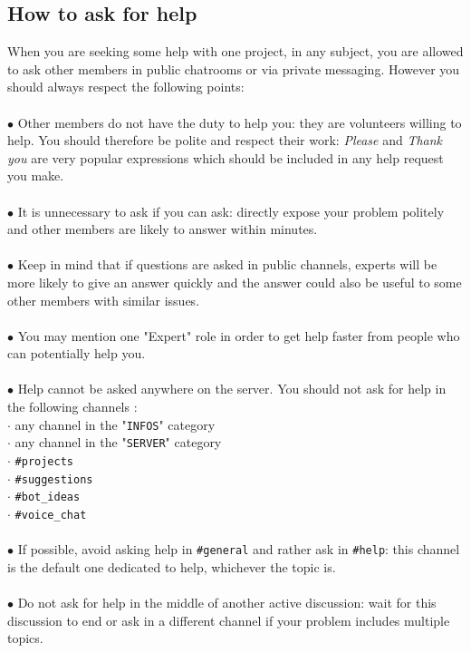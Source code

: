\documentclass[a4paper]{article}
\begin{document}
\subsection{How to ask for help}
When you are seeking some help with one project, in any subject, you are allowed to ask other members in public chatrooms or via private messaging. However you should always respect the following points:\\\\
$\bullet$ Other members do not have the duty to help you: they are volunteers willing to help. You should therefore be polite and respect their work: \textsl{Please} and \textsl{Thank you} are very popular expressions which should be included in any help request you make.\\\\
$\bullet$ It is unnecessary to ask if you can ask: directly expose your problem politely and other members are likely to answer within minutes.\\\\
$\bullet$ Keep in mind that if questions are asked in public channels, experts will be more likely to give an answer quickly and the answer could also be useful to some other members with similar issues.\\\\
$\bullet$ You may mention one "Expert" role in order to get help faster from people who can potentially help you.\\\\
$\bullet$ Help cannot be asked anywhere on the server. You should not ask for help in the following channels :\\
$\cdot$ any channel in the "\texttt{INFOS}" category\\
$\cdot$ any channel in the "\texttt{SERVER}" category\\
$\cdot$ \texttt{\#projects}\\
$\cdot$ \texttt{\#suggestions}\\
$\cdot$ \texttt{\#bot\_ideas}\\
$\cdot$ \texttt{\#voice\_chat}\\\\
$\bullet$ If possible, avoid asking help in \texttt{\#general} and rather ask in \texttt{\#help}: this channel is the default one dedicated to help, whichever the topic is.\\\\
$\bullet$ Do not ask for help in the middle of another active discussion: wait for this discussion to end or ask in a different channel if your problem includes multiple topics.
\end{document}
